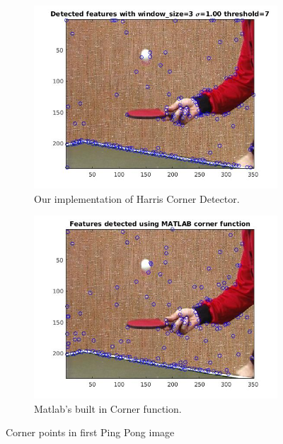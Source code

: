 \documentclass[11pt]{article}
\begin{document}
\begin{figure}[H] \centering
	\begin{subfigure}{.5\textwidth} \centering
		\includegraphics[width=.9\textwidth]{imgs/ourCorners_pingpong.jpg}
		\caption{Our implementation of Harris Corner Detector.}
		\label{fig:ourCorners_pingpong}
	\end{subfigure}%
	\begin{subfigure}{.5\textwidth}	\centering
		\includegraphics[width=.9\textwidth]{imgs/matlabCorners_pingpong.jpg}
		\caption{Matlab's built in Corner function.}
		\label{fig:matlabCorners_pingpong}
	\end{subfigure}
	\caption{Corner points in first Ping Pong image}
	\label{fig:corners_pingpong}
\end{figure}
\end{document}
